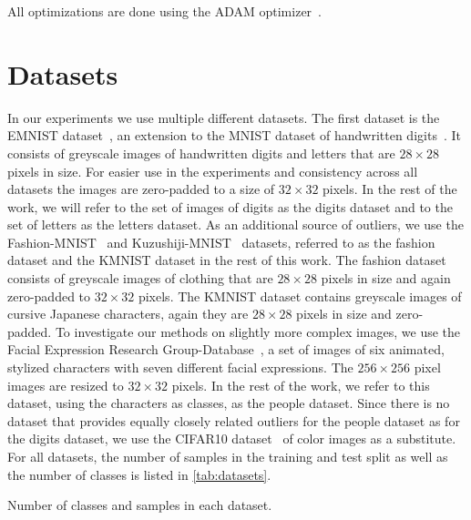 All optimizations are done using the ADAM
optimizer~\citep{kingmaAdamMethodStochastic2017}.

\section{Datasets}%
\label{sec:datasets}

In our experiments we use multiple different datasets. The first dataset is the
EMNIST dataset~\citep{cohenEMNISTExtensionMNIST2017}, an extension to the MNIST
dataset of handwritten digits~\citep{lecunGradientbasedLearningApplied1998}. It
consists of greyscale images of handwritten digits and letters that are $28
	\times 28$ pixels in size. For easier use in the experiments and consistency
across all datasets the images are zero-padded to a size of $32 \times 32$
pixels. In the rest of the work, we will refer to the set of images of digits
as the digits dataset and to the set of letters as the letters dataset.
As an additional source of outliers, we use the
Fashion-MNIST~\citep{xiaoFashionmnistNovelImage2017} and
Kuzushiji-MNIST~\citep{clanuwatDeepLearningClassical2018} datasets, referred to
as the fashion dataset and the KMNIST dataset in the rest of this work. The
fashion dataset consists of greyscale images of clothing that are $28 \times
	28$ pixels in size and again zero-padded to $32 \times 32$ pixels. The KMNIST
dataset contains greyscale images of cursive Japanese characters, again they
are $28 \times 28$ pixels in size and zero-padded.
To investigate our methods on slightly more complex images, we use the Facial
Expression Research Group-Database~\citep{anejaModelingStylizedCharacter2017a},
a set of images of six animated, stylized characters with seven different
facial expressions. The $256 \times 256$ pixel images are resized to $32 \times
	32$ pixels. In the rest of the work, we refer to this dataset, using the
characters as classes, as the people dataset. Since there is no dataset that
provides equally closely related outliers for the people dataset as for the
digits dataset, we use the CIFAR10
dataset~\citep{krizhevskyLearningMultipleLayers2009} of color images as a
substitute. For all datasets, the number of samples in the training and test
split as well as the number of classes is listed in \autoref{tab:datasets}.

\begin{table}[htpb]
	\centering
	\caption{Number of classes and samples in each dataset.}
	\label{tab:datasets}
	
\end{table}
